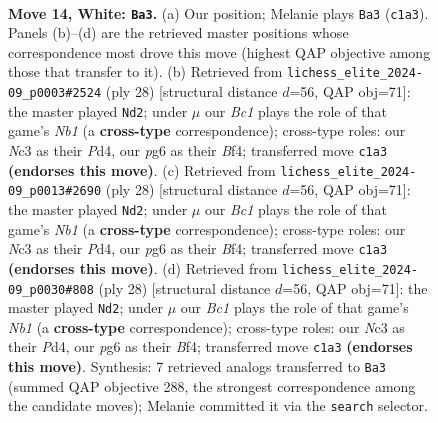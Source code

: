 \documentclass[11pt]{article}
\begin{document}
\clearpage

\begin{figure}[p]\centering
\begin{subfigure}{0.46\textwidth}\centering
\resizebox{\linewidth}{!}{%
\newchessgame
\chessboard[
  setfen={r1b3k1/ppppqp1p/3n1bp1/8/8/1PN2P2/P1PP2PP/R1B1QBK1 w - - 1 14},
  showmover=false,
  pgfstyle=straightmove, color=movearrow, markmove={c1-a3}
]}
\caption{}
\end{subfigure}\hfill
\begin{subfigure}{0.46\textwidth}\centering
\resizebox{\linewidth}{!}{%
\newchessgame
\chessboard[
  setfen={r1b3k1/ppp1qppp/3p1b2/5n2/3P1B2/2P4P/PP3PP1/RN2QBK1 w - - 1 15},
  showmover=false,
  pgfstyle=straightmove, color=movearrow, markmove={b1-d2}
]}
\caption{}
\end{subfigure}
\\[4pt]
\begin{subfigure}{0.46\textwidth}\centering
\resizebox{\linewidth}{!}{%
\newchessgame
\chessboard[
  setfen={r1b3k1/ppp1qppp/3p1b2/5n2/3P1B2/2P4P/PP3PP1/RN2QBK1 w - - 1 15},
  showmover=false,
  pgfstyle=straightmove, color=movearrow, markmove={b1-d2}
]}
\caption{}
\end{subfigure}\hfill
\begin{subfigure}{0.46\textwidth}\centering
\resizebox{\linewidth}{!}{%
\newchessgame
\chessboard[
  setfen={r1b3k1/ppp1qppp/3p1b2/5n2/3P1B2/2P4P/PP3PP1/RN2QBK1 w - - 1 15},
  showmover=false,
  pgfstyle=straightmove, color=movearrow, markmove={b1-d2}
]}
\caption{}
\end{subfigure}
\caption{\textbf{Move 14, White: \texttt{Ba3}.} (a) Our position; Melanie plays \texttt{Ba3} (\texttt{c1a3}). Panels (b)--(d) are the retrieved master positions whose correspondence most drove this move (highest QAP objective among those that transfer to it). (b) Retrieved from \texttt{lichess\_elite\_2024-09\_p0003\#2524} (ply 28) [structural distance $d$=56, QAP obj=71]: the master played \texttt{Nd2}; under $\mu$ our \emph{Bc1} plays the role of that game's \emph{Nb1} (a \textbf{cross-type} correspondence); cross-type roles: our \emph{N}c3 as their \emph{P}d4, our \emph{p}g6 as their \emph{B}f4; transferred move \texttt{c1a3} \textbf{(endorses this move)}. (c) Retrieved from \texttt{lichess\_elite\_2024-09\_p0013\#2690} (ply 28) [structural distance $d$=56, QAP obj=71]: the master played \texttt{Nd2}; under $\mu$ our \emph{Bc1} plays the role of that game's \emph{Nb1} (a \textbf{cross-type} correspondence); cross-type roles: our \emph{N}c3 as their \emph{P}d4, our \emph{p}g6 as their \emph{B}f4; transferred move \texttt{c1a3} \textbf{(endorses this move)}. (d) Retrieved from \texttt{lichess\_elite\_2024-09\_p0030\#808} (ply 28) [structural distance $d$=56, QAP obj=71]: the master played \texttt{Nd2}; under $\mu$ our \emph{Bc1} plays the role of that game's \emph{Nb1} (a \textbf{cross-type} correspondence); cross-type roles: our \emph{N}c3 as their \emph{P}d4, our \emph{p}g6 as their \emph{B}f4; transferred move \texttt{c1a3} \textbf{(endorses this move)}. Synthesis: 7 retrieved analogs transferred to \texttt{Ba3} (summed QAP objective 288, the strongest correspondence among the candidate moves); Melanie committed it via the \texttt{search} selector.}

\end{figure}
\end{document}

